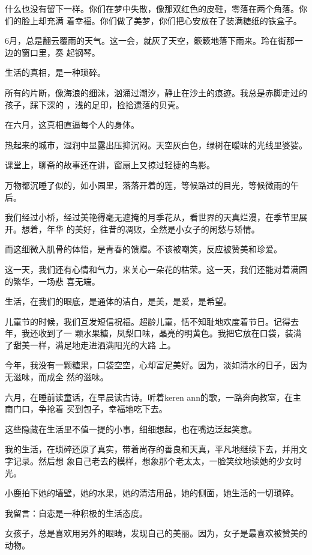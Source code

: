 \documentclass[12pt,a4paper]{article}
\begin{document}
		什么也没有留下一样。你们在梦中失散，像那双红色的皮鞋，零落在两个角落。你们的脸上却充满
	着幸福。你们做了美梦，你们把心安放在了装满糖纸的铁盒子。


		6月，总是翻云覆雨的天气。这一会，就灰了天空，簌簌地落下雨来。玲在街那一边的窗口里，奏
	起钢琴。

	\endwriting



		生活的真相，是一种琐碎。

		所有的片断，像海浪的细沫，汹涌过潮汐，静止在沙土的痕迹。我总是赤脚走过的孩子，踩下深的
	，浅的足印，捡拾遗落的贝壳。

		在六月，这真相直逼每个人的身体。\par
		热起来的城市，湿润中显露出压抑沉闷。天空灰白色，绿树在暧昧的光线里婆娑。\par
		课堂上，聊斋的故事还在讲，窗扇上又掠过轻捷的鸟影。

		万物都沉睡了似的，如小园里，落落开着的莲，等候路过的目光，等候微雨的午后。

		我们经过小桥，经过美艳得毫无遮掩的月季花从，看世界的天真烂漫，在季节里展开。想着，年华
	的美好，往昔的凋败，全然是小女子的闲愁与矫情。

		而这细微入肌骨的体悟，是青春的馈赠。不该被嘲笑，反应被赞美和珍爱。

		这一天，我们还有心情和气力，来关心一朵花的枯荣。这一天，我们还能对着满园的繁华，一场悲
	喜无端。

		生活，在我们的眼底，是通体的洁白，是美，是爱，是希望。

		儿童节的时候，我们互发短信祝福。超龄儿童，恬不知耻地欢度着节日。记得去年，我还收到了一
	颗水果糖，凤梨口味，晶亮的明黄色。我把它放在口袋，装满了甜美一样，满足地走进洒满阳光的大路
	上。

		今年，我没有一颗糖果，口袋空空，心却富足美好。因为，淡如清水的日子，因为无滋味，而成全
	然的滋味。

		六月，在睡前读童话，在早晨读古诗。听着keren ann的歌，一路奔向教室，在主南门口，争抢着
	买到包子，幸福地吃下去。

		这些隐藏在生活里不值一提的小事，细细想起，也在嘴边泛起笑意。

		我的生活，在琐碎还原了真实，带着尚存的善良和天真，平凡地继续下去，并用文字记录。然后想
	象自己老去的模样，想象那个老太太，一脸笑纹地读她的少女时光。

		小鹿拍下她的墙壁，她的水果，她的清洁用品，她的侧面，她生活的一切琐碎。\par
		我留言：自恋是一种积极的生活态度。\par
		女孩子，总是喜欢用另外的眼睛，发现自己的美丽。因为，女子是最喜欢被赞美的动物。
\end{document}
